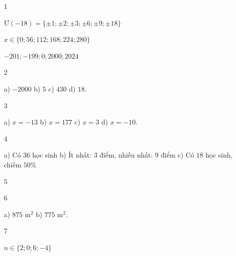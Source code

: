 \begin{Solbook}{1}
 \par \noindent \begin {listEX}[2] \item Ư$(-18)=\{\pm 1;\pm 2;\pm 3;\pm 6;\pm 9;\pm 18\}$ \item $x\in \{0;56;112;168;224;280\}$ \item $-201;-199;0;2000;2024$ \end {listEX}  \hfill \qedEX 
\end{Solbook}
\begin{Solbook}{2}
 \par \noindent a) $-2000$ \hfill b) $5$ \hfill c) $430$ \hfill d) $18$.  \hfill \qedEX 
\end{Solbook}
\begin{Solbook}{3}
 \par \noindent a) $x=-13$ \hfill b) $x=177$ \hfill c) $x=3$ \hfill d) $x=-10$.  \hfill \qedEX 
\end{Solbook}
\begin{Solbook}{4}
 \par \noindent a) Có $36$ học sinh \hfill b) Ít nhất: $3$ điểm, nhiều nhất: $9$ điểm \hfill c) Có $18$ học sinh, chiếm $50\%$  \hfill \qedEX 
\end{Solbook}
\begin{Solbook}{5}
 \par \noindent  \text {}  \hfill \qedEX 
\end{Solbook}
\begin{Solbook}{6}
 \par \noindent a) $875$ m$^2$ \hfill b) $775$ m$^2$. \hfill \qedEX 
\end{Solbook}
\begin{Solbook}{7}
 \par \noindent $n\in \{2;0;6;-4\}$ \hfill \qedEX 
\end{Solbook}

